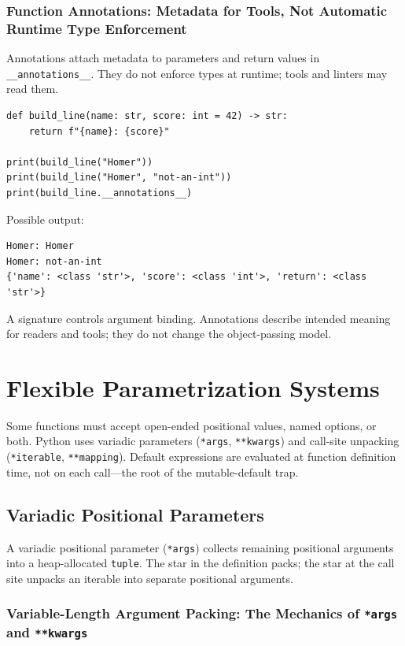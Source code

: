 \documentclass[a4paper,twoside]{report}
\begin{document}
\subsubsection{Function Annotations: Metadata for Tools, Not Automatic Runtime Type Enforcement}

Annotations attach metadata to parameters and return values in \texttt{\_\_annotations\_\_}. They do not enforce types at runtime; tools and linters may read them.

\begin{verbatim}
def build_line(name: str, score: int = 42) -> str:
    return f"{name}: {score}"

print(build_line("Homer"))
print(build_line("Homer", "not-an-int"))
print(build_line.__annotations__)
\end{verbatim}

Possible output:

\begin{verbatim}
Homer: Homer
Homer: not-an-int
{'name': <class 'str'>, 'score': <class 'int'>, 'return': <class 'str'>}
\end{verbatim}

A signature controls argument binding. Annotations describe intended meaning for readers and tools; they do not change the object-passing model.


\section{Flexible Parametrization Systems}

Some functions must accept open-ended positional values, named options, or both. Python uses variadic parameters (\texttt{*args}, \texttt{**kwargs}) and call-site unpacking (\texttt{*iterable}, \texttt{**mapping}). Default expressions are evaluated at function definition time, not on each call---the root of the mutable-default trap.


\subsection{Variadic Positional Parameters}

A variadic positional parameter (\texttt{*args}) collects remaining positional arguments into a heap-allocated \texttt{tuple}. The star in the definition packs; the star at the call site unpacks an iterable into separate positional arguments.

\subsubsection{Variable-Length Argument Packing: The Mechanics of \texttt{*args} and \texttt{**kwargs}}
\end{document}
